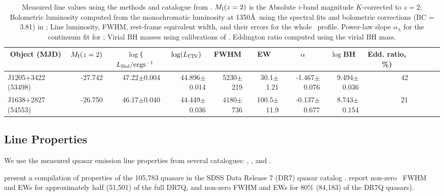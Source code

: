 \documentclass[a4paper,fleqn,usenatbib]{mnras}
\begin{document}
\begin{table}
\begin{tabular}{ l rrr rrr rrr rrr}
\hline
\hline
  \multicolumn{1}{c}{Object (MJD)} &
  \multicolumn{1}{c}{$M_{\rm I}(z=2)$} &
  \multicolumn{1}{c}{$\log$($L_{\rm Bol} / {\rm erg s}^{-1}$} &
  \multicolumn{1}{c}{$\log(L_{\rm CIV})$} &
  \multicolumn{1}{c}{FWHM} &
  \multicolumn{1}{c}{EW} &
  \multicolumn{1}{c}{$\alpha$} &
  \multicolumn{1}{c}{$\log$BH } &
  \multicolumn{1}{c}{Edd. ratio, \%)} \\
\hline
  J1205+3422 (53498)   & 
  -27.742                      & 47.22$\pm$0.004    &    %
44.896$\pm$0.014     &   5230$\pm$219          & 30.1$\pm$1.21        &  -1.467$\pm$0.076    &  %
  9.494$\pm$0.036    &  42 \\
 J1638+2827 (54553)   & 
 -26.750                      & 46.17$\pm$0.040    & %
44.449$\pm$0.036    &  4180$\pm$736          & 100.5$\pm$11.9      & -0.137$\pm$0.677    &   %
  8.743$\pm$0.154     & 21  \\
\hline
\hline
\end{tabular}
 \caption{
Measured line values using the methods and catalogue from
\citet{Shen2011}.  $M_{\rm I}(z=2)$ is the Absolute $i$-band magnitude
$K$-corrected to $z = 2$; Bolometric luminosity computed from the
monochromatic luminosity at 1350\AA\ using the spectral fits and
bolometric corrections (BC = 3.81) in \citet{Richards2006b}; Line
luminosity, FWHM, rest-frame equivalent width, and their errors for
the whole \civ\ profile.  Power-law slope $\alpha_{\lambda}$ for the
continuum fit for \civ; Virial BH masses using calibrations of
\citet{VestergaardPeterson2006}.  Eddington ratio computed using the
virial BH mass.
}
 \label{tab:Shen11_lines}
\end{table}


\subsection{Line Properties}  
We use the measured quasar emission line properties from several catalogues: 
\citet{Shen2011}, \citet{Hamann2017}, \citet{Kozlowski2017} and
\citet{Calderone2017}.

\citet{Shen2011} present a compilation of properties of the 105,783
quasars in the SDSS Data Release 7 (DR7) quasar catalog \citep[DR7Q;
][]{Schneider2007}. \citet{Shen2011} report non-zero \civ\ FWHM and
EWs for approximately half (51,501) of the full DR7Q, and non-zero
\mgii FWHM and EWs for 80\% (84,183) of the DR7Q quasars).
\end{document}
